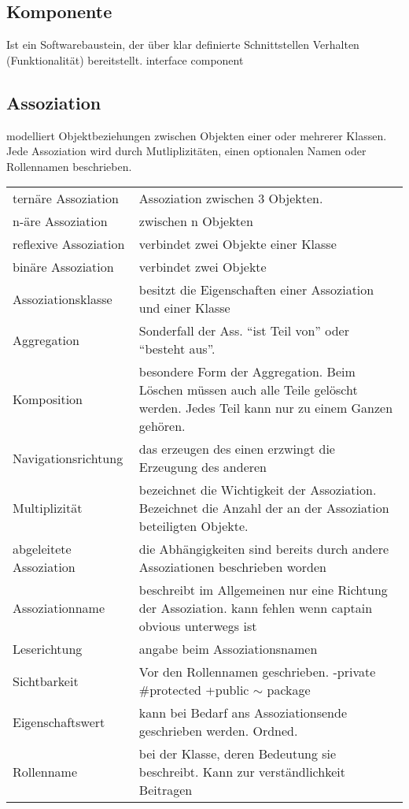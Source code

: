 \subsection{Komponente}
Ist ein Softwarebaustein, der über klar definierte Schnittstellen Verhalten
(Funktionalität) bereitstellt.
interface
component

\subsection{Assoziation}
	modelliert Objektbeziehungen zwischen Objekten einer oder mehrerer Klassen. Jede
	Assoziation wird durch Mutliplizitäten, einen optionalen Namen oder Rollennamen
	beschrieben.\\
	\begin{tabular}{p{3.5cm}p{14.5cm}}
		ternäre Assoziation & Assoziation zwischen 3 Objekten.\\
		n-äre Assoziation & zwischen n Objekten\\
		reflexive Assoziation & verbindet zwei Objekte einer Klasse\\
		binäre Assoziation & verbindet zwei Objekte \\
		Assoziationsklasse & besitzt die Eigenschaften einer Assoziation und einer
		Klasse \\
		Aggregation & Sonderfall der Ass. "`ist Teil von"' oder "`besteht aus"'.\\
		Komposition & besondere Form der Aggregation. Beim Löschen müssen auch alle
		Teile gelöscht werden. Jedes Teil kann nur zu einem Ganzen gehören.\\
		Navigationsrichtung & das erzeugen des einen erzwingt die Erzeugung des
		anderen\\
		Multiplizität & bezeichnet die Wichtigkeit der Assoziation. Bezeichnet die
		Anzahl der an der Assoziation beteiligten Objekte.\\
		abgeleitete Assoziation &
		die Abhängigkeiten sind bereits durch andere Assoziationen beschrieben worden\\
		Assoziationname & beschreibt im Allgemeinen nur eine Richtung der
		Assoziation. kann fehlen wenn captain obvious unterwegs ist\\ 
		Leserichtung & angabe beim Assoziationsnamen\\ 
		Sichtbarkeit & Vor den Rollennamen geschrieben. -private \#protected +public
		$\sim$ package\\ 
		Eigenschaftswert & kann bei Bedarf ans Assoziationsende geschrieben werden.
		Ordned.\\
		Rollenname & bei der Klasse, deren Bedeutung sie beschreibt. Kann zur
		verständlichkeit Beitragen\\
	\end{tabular}

